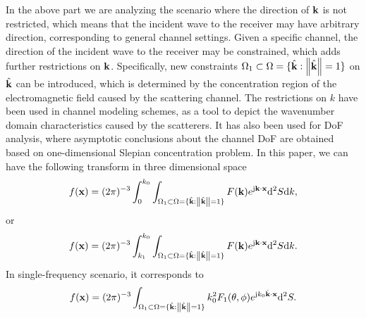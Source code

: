 \documentclass[12pt,draftclsnofoot,journal,onecolumn]{IEEEtran}
\begin{document}
	In the above part we are analyzing the scenario where the direction of ${\bf k}$ is not restricted, which means that the incident wave to the receiver may have arbitrary direction, corresponding to general channel settings. Given a specific channel, the direction of the incident wave to the receiver may be constrained, which adds further restrictions on ${\bf k}$.  Specifically, new constraints ${\Omega}_1 \subset {\Omega}=\{\hat{\bf k}: \left\| \hat{\bf k} \right\|=1\}$ on $\hat{\bf k}$ can be introduced, which is determined by the concentration region of the electromagnetic field caused by the scattering channel. {\color{red} The restrictions on $k$ have been used in channel modeling schemes\cite{pizzo2022fourier}, as a tool to depict the wavenumber domain characteristics caused by the scatterers.
	It has also been used for DoF analysis\cite{poon2005degrees}, where asymptotic conclusions about the channel DoF are obtained based on one-dimensional Slepian concentration problem. } In this paper, we can have the following transform in three dimensional space
	\begin{equation}
		\begin{aligned}
			f({\bf x})=(2\pi)^{-3}\int_0^{k_0} \int_{{\Omega}_1 \subset {\Omega}=\{\hat{\bf k}: \left\| \hat{\bf k} \right\|=1\}} F({\bf k})e^{{\rm j}{\bf k}\cdot {\bf x}}{\rm d}^2S {\rm d}{k},
		\end{aligned}
		\label{eqn_wavenumber_constraint1}
	\end{equation}
	or
	\begin{equation}
		\begin{aligned}
			f({\bf x})=(2\pi)^{-3}\int_{k_1}^{k_0} \int_{{\Omega}_1 \subset {\Omega}=\{\hat{\bf k}: \left\| \hat{\bf k} \right\|=1\}} F({\bf k})e^{{\rm j}{\bf k}\cdot {\bf x}}{\rm d}^2S {\rm d}{k}.
		\end{aligned}
		\label{eqn_wavenumber_constraint2}
	\end{equation}
	In single-frequency scenario, it corresponds to
	\begin{equation}
		\begin{aligned}
			f({\bf x})=(2\pi)^{-3}\int_{{\Omega}_1 \subset {\Omega}=\{\hat{\bf k}: \left\| \hat{\bf k} \right\|=1\}}k_0^2F_1(\theta,\phi)e^{{\rm j}k_0\hat{\bf k}\cdot {\bf x}}{\rm d}^2S.
		\end{aligned}
		\label{eqn_wavenumber_constraint3}
	\end{equation}
	
\end{document}
